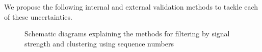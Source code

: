 We propose the following internal and external validation methods to tackle each
of these uncertainties.

\begin{figure} 
\centering 
{}
\hspace{20pt}
\caption {Schematic diagrams explaining the methods for filtering by signal
	strength and clustering using sequence numbers}
\label{methodology_schematic}
\end{figure}

